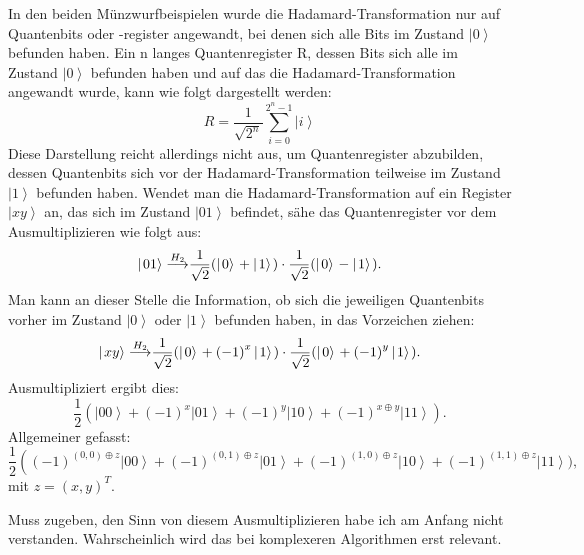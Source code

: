 In den beiden Münzwurfbeispielen wurde die Hadamard-Transformation nur auf Quantenbits oder -register angewandt, bei denen sich alle Bits im Zustand $\left|0\right\rangle$ befunden haben. Ein n langes Quantenregister R, dessen Bits sich alle im Zustand $\left|0\right\rangle$ befunden haben und auf das die Hadamard-Transformation angewandt wurde, kann wie folgt dargestellt werden:
$$R=\frac{1}{\sqrt{2^n}}\sum_{i=0}^{2^n-1}\left|\left.i\right\rangle\right.$$
Diese Darstellung reicht allerdings nicht aus, um Quantenregister abzubilden, dessen Quantenbits sich vor der Hadamard-Transformation teilweise im Zustand $\left|1\right\rangle$ befunden haben. Wendet man die Hadamard-Transformation auf ein Register $\left|xy\right\rangle$ an, das sich im Zustand $\left|01\right\rangle$ befindet, sähe das Quantenregister vor dem Ausmultiplizieren wie folgt aus:
$$\left|\left.01\right\rangle\right.{\buildrel H_2\over\longrightarrow}\frac{1}{\sqrt2}(\left|\left.0\right\rangle\right.+\left|\left.1\right\rangle\right.)\cdot\frac{1}{\sqrt2}(\left|\left.0\right\rangle\right.-\left|\left.1\right\rangle\right.).$$
Man kann an dieser Stelle die Information, ob sich die jeweiligen Quantenbits vorher im Zustand $\left|0\right\rangle$ oder $\left|1\right\rangle$ befunden haben, in das Vorzeichen ziehen:
$$\left|\left.xy\right\rangle\right.{\buildrel H_2\over\longrightarrow}\frac{1}{\sqrt2}(\left|\left.0\right\rangle\right.+{(-1)}^x\left|\left.1\right\rangle\right.)\cdot\frac{1}{\sqrt2}(\left|\left.0\right\rangle\right.+{(-1)}^y\left|\left.1\right\rangle\right.).$$
Ausmultipliziert ergibt dies: 
$$\frac{1}{2}\left(\left|\left.00\right\rangle\right.+\left(-1\right)^x\left|\left.01\right\rangle\right.+\left(-1\right)^y\left|\left.10\right\rangle\right.+\left(-1\right)^{x\oplus y}\left|\left.11\right\rangle\right.\right).$$
Allgemeiner gefasst:
$$\frac{1}{2}\left(\left(-1\right)^{\left(0,0\right)\oplus z}\left|\left.00\right\rangle\right.+\left(-1\right)^{\left(0,1\right)\oplus z}\left|\left.01\right\rangle\right.+\left(-1\right)^{\left(1,0\right)\oplus z}\left|\left.10\right\rangle\right.+\left(-1\right)^{\left(1,1\right)\oplus z}\left|\left.11\right\rangle\right.\right.),$$
mit $z={(x,y)}^T$.

Muss zugeben, den Sinn von diesem Ausmultiplizieren habe ich am Anfang nicht verstanden. Wahrscheinlich wird das bei komplexeren Algorithmen erst relevant.

